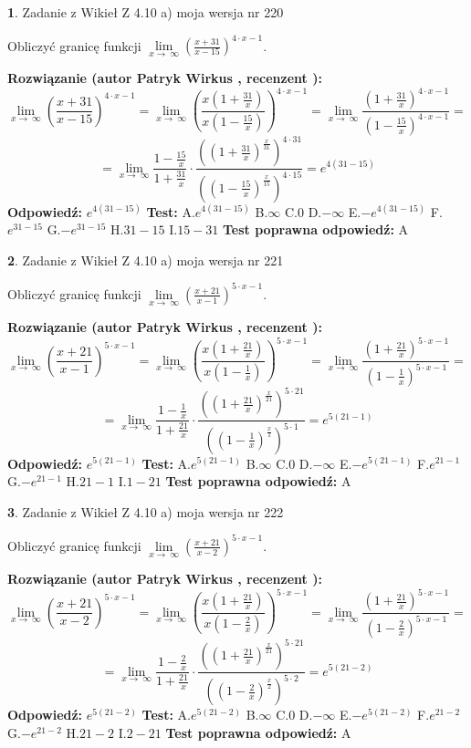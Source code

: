 \documentclass[12pt, a4paper]{article}
\theoremstyle{definition} %
\newtheorem{zad}{}
\newcommand{\zadStart}[1]{\begin{zad}#1\newline}
\newcommand{\zadStop}{\end{zad}}
\newcommand{\rozwStart}[2]{\noindent \textbf{Rozwiązanie (autor #1 , recenzent #2): }\newline}
\newcommand{\rozwStop}{\newline}
\newcommand{\odpStart}{\noindent \textbf{Odpowiedź:}\newline}
\newcommand{\odpStop}{\newline}
\newcommand{\testStart}{\noindent \textbf{Test:}\newline}
\newcommand{\testStop}{\newline}
\newcommand{\kluczStart}{\noindent \textbf{Test poprawna odpowiedź:}\newline}
\newcommand{\kluczStop}{\newline}
\begin{document}
\zadStart{Zadanie z Wikieł Z 4.10 a) moja wersja nr 220}


Obliczyć granicę funkcji  $\lim\limits_{x\to\ \infty}(\frac{x+31}{x-15})^{4\cdot x-1}$.
\zadStop
\rozwStart{Patryk Wirkus}{}
$$\lim\limits_{x\to\ \infty}(\frac{x+31}{x-15})^{4\cdot x-1} = \lim\limits_{x\to\ \infty}(\frac{x(1+\frac{31}{x})}{x(1-\frac{15}{x})})^{4\cdot x-1}=\lim\limits_{x\to\ \infty}\frac{(1+\frac{31}{x})^{4\cdot x-1}}{(1-\frac{15}{x})^{4\cdot x-1}}=$$
$$=\lim\limits_{x\to\ \infty}\frac{1-\frac{15}{x}}{1+\frac{31}{x}}\cdot\frac{((1+\frac{31}{x})^{\frac{x}{31}})^{4\cdot31}}{((1-\frac{15}{x})^{\frac{x}{15}})^{4\cdot15}}=e^{4(31-15)}$$
\rozwStop
\odpStart
$e^{4(31-15)}$
\odpStop
\testStart
A.$e^{4(31-15)}$ B.$\infty$ C.$0$ D.$-\infty$ E.$-e^{4(31-15)}$
F.$e^{31-15}$ G.$-e^{31-15}$
H.$31-15$
I.$15-31$
\testStop
\kluczStart
A
\kluczStop



\zadStart{Zadanie z Wikieł Z 4.10 a) moja wersja nr 221}


Obliczyć granicę funkcji  $\lim\limits_{x\to\ \infty}(\frac{x+21}{x-1})^{5\cdot x-1}$.
\zadStop
\rozwStart{Patryk Wirkus}{}
$$\lim\limits_{x\to\ \infty}(\frac{x+21}{x-1})^{5\cdot x-1} = \lim\limits_{x\to\ \infty}(\frac{x(1+\frac{21}{x})}{x(1-\frac{1}{x})})^{5\cdot x-1}=\lim\limits_{x\to\ \infty}\frac{(1+\frac{21}{x})^{5\cdot x-1}}{(1-\frac{1}{x})^{5\cdot x-1}}=$$
$$=\lim\limits_{x\to\ \infty}\frac{1-\frac{1}{x}}{1+\frac{21}{x}}\cdot\frac{((1+\frac{21}{x})^{\frac{x}{21}})^{5\cdot21}}{((1-\frac{1}{x})^{\frac{x}{1}})^{5\cdot1}}=e^{5(21-1)}$$
\rozwStop
\odpStart
$e^{5(21-1)}$
\odpStop
\testStart
A.$e^{5(21-1)}$ B.$\infty$ C.$0$ D.$-\infty$ E.$-e^{5(21-1)}$
F.$e^{21-1}$ G.$-e^{21-1}$
H.$21-1$
I.$1-21$
\testStop
\kluczStart
A
\kluczStop



\zadStart{Zadanie z Wikieł Z 4.10 a) moja wersja nr 222}


Obliczyć granicę funkcji  $\lim\limits_{x\to\ \infty}(\frac{x+21}{x-2})^{5\cdot x-1}$.
\zadStop
\rozwStart{Patryk Wirkus}{}
$$\lim\limits_{x\to\ \infty}(\frac{x+21}{x-2})^{5\cdot x-1} = \lim\limits_{x\to\ \infty}(\frac{x(1+\frac{21}{x})}{x(1-\frac{2}{x})})^{5\cdot x-1}=\lim\limits_{x\to\ \infty}\frac{(1+\frac{21}{x})^{5\cdot x-1}}{(1-\frac{2}{x})^{5\cdot x-1}}=$$
$$=\lim\limits_{x\to\ \infty}\frac{1-\frac{2}{x}}{1+\frac{21}{x}}\cdot\frac{((1+\frac{21}{x})^{\frac{x}{21}})^{5\cdot21}}{((1-\frac{2}{x})^{\frac{x}{2}})^{5\cdot2}}=e^{5(21-2)}$$
\rozwStop
\odpStart
$e^{5(21-2)}$
\odpStop
\testStart
A.$e^{5(21-2)}$ B.$\infty$ C.$0$ D.$-\infty$ E.$-e^{5(21-2)}$
F.$e^{21-2}$ G.$-e^{21-2}$
H.$21-2$
I.$2-21$
\testStop
\kluczStart
A
\kluczStop
\end{document}
